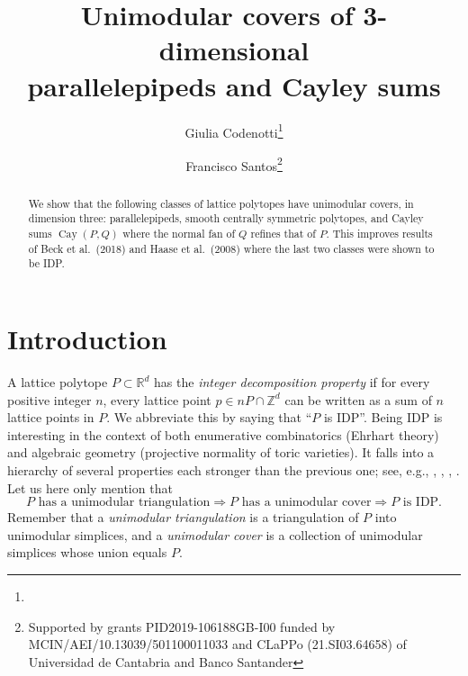 \documentclass[12pt]{article}
\title{Unimodular covers of 3-dimensional\\ parallelepipeds and Cayley sums}
\author[1]{Giulia Codenotti\thanks{}}
\author[2]{Francisco Santos\thanks{Supported by grants PID2019-106188GB-I00 funded by MCIN/AEI/10.13039/501100011033 and CLaPPo (21.SI03.64658) of Universidad de Cantabria and Banco Santander}}
\affil[1]{%
Institute of Mathematics, Freie Universit\"at Berlin, 

\email{giulia.codenotti@fu-berlin.de}%
}
\affil[2]{%
Department of Mathematics, Statistics and Computer Science, University of Cantabria, Spain

\email{francisco.santos@unican.es}%
}
\newcommand{\Z}{ \ensuremath{\mathbb{Z}}}
\newcommand{\R}{ \ensuremath{\mathbb{R}}}
\newcommand{\cayley}{\operatorname{Cay}}
\begin{document}

\maketitle


\begin{abstract}
 We show that the following classes of lattice polytopes have unimodular covers, in dimension three:  parallelepipeds,  smooth centrally symmetric polytopes, and  Cayley sums $\cayley(P,Q)$ where the normal fan of $Q$ refines that of $P$. This improves results of Beck et al.~(2018) and Haase et al.~(2008) where the last two classes were shown to be IDP.
\end{abstract}



\section{Introduction}

A lattice polytope $P\subset \R^d$ has the \emph{integer decomposition property} if for every positive integer $n$, every lattice point $p \in nP\cap \Z^d$ can be written as a sum of $n$ lattice points in $P$. We abbreviate this by saying that ``$P$ is IDP''. Being IDP is interesting in the context of  both enumerative combinatorics (Ehrhart theory) and algebraic geometry (projective normality of toric
varieties). It falls into a hierarchy of several properties each stronger than the previous one; see, e.g., \cite[Section 2.D]{BGbook}, \cite[Sect. 1.2.5]{HPPS-survey}, \cite[p. 2097]{mfo2004}, \cite[p. 2313]{mfo2007}.
Let us here only mention that
\[
P \text{ has a unimodular triangulation}\Rightarrow
P \text{ has a unimodular cover}\Rightarrow
P \text{ is IDP.}
\]
Remember that a \emph{unimodular triangulation} is a triangulation of $P$ into unimodular simplices, and a \emph{unimodular cover} is a collection of unimodular simplices whose union equals $P$. 
\end{document}

